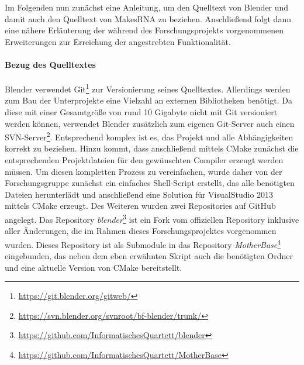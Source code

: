 Im Folgenden nun zunächst eine Anleitung, um den Quelltext von Blender und damit auch den Quelltext von MakesRNA zu beziehen. Anschließend folgt dann eine nähere Erläuterung der während des Forschungsprojekts vorgenommenen Erweiterungen zur Erreichung der angestrebten Funktionalität.

\paragraph{Bezug des Quelltextes}
\label{sec:buildblender}

Blender verwendet Git\footnote{\url{https://git.blender.org/gitweb/}} zur Versionierung seines Quelltextes. Allerdings werden zum Bau der Unterprojekte eine Vielzahl an externen Bibliotheken benötigt. Da diese mit einer Gesamtgröße von rund 10 Gigabyte nicht mit Git versioniert werden können, verwendet Blender zusätzlich zum eigenen Git-Server auch einen SVN-Server\footnote{\url{https://svn.blender.org/svnroot/bf-blender/trunk/}}. Entsprechend komplex ist es, das Projekt und alle Abhängigkeiten korrekt zu beziehen. Hinzu kommt, dass anschließend mittels CMake zunächst die entsprechenden Projektdateien für den gewünschten Compiler erzeugt werden müssen. Um diesen kompletten Prozess zu vereinfachen, wurde daher von der Forschungsgruppe zunächst ein einfaches Shell-Script erstellt, das alle benötigten Dateien herunterlädt und anschließend eine Solution für VisualStudio 2013 mittels CMake erzeugt. Des Weiteren wurden zwei Repositories auf GitHub angelegt. Das Repository \emph{blender}\footnote{\url{https://github.com/InformatischesQuartett/blender}} ist ein Fork vom offiziellen Repository inklusive aller Änderungen, die im Rahmen dieses Forschungsprojektes vorgenommen wurden. Dieses Repository ist als Submodule in das Repository \emph{MotherBase}\footnote{\url{https://github.com/InformatischesQuartett/MotherBase}} eingebunden, das neben dem eben erwähnten Skript auch die benötigten Ordner und eine aktuelle Version von CMake bereitstellt.

